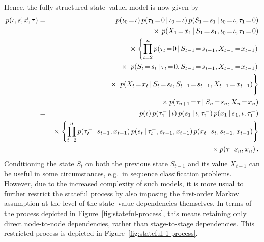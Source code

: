 \documentclass[a4paper]{article}
\begin{document}
Hence, the fully-structured state--valuel model is now given by
\begin{eqnarray}
p({\iota},\vec{s},\vec{x},{\tau}) & = & 
p(\iota_0\!=\!{\iota})\,p(\tau_1\!=\!0\,|\,\iota_0\!=\!{\iota})
\,p(S_1\!=\!s_1\,|\,\iota_0\!=\!{\iota},\tau_1\!=\!0)
\nonumber\\&&{}\times
\,p(X_1\!=\!x_1\,|\,S_1\!=\!s_1,\iota_0\!=\!{\iota},\tau_1\!=\!0)
\nonumber\\&&
{}\times\left\{\prod_{t=2}^{n}p(\tau_t\!=\!0\,|\,S_{t-1}\!=\!s_{t-1},X_{t-1}\!=\!x_{t-1})\right.
\nonumber\\&&\hspace*{10mm}{}\times\left.
\,p(S_t\!=\!s_t\,|\,\tau_t\!=\!0,S_{t-1}\!=\!s_{t-1},X_{t-1}\!=\!x_{t-1})\right.
\nonumber\\&&\hspace*{10mm}{}\times\left.\rule{0pt}{6mm}
\,p(X_t\!=\!x_t\,|\,S_t\!=\!s_t,S_{t-1}\!=\!s_{t-1},X_{t-1}\!=\!x_{t-1})\right\}
\nonumber\\&&
{}\times p(\tau_{n+1}\!=\!{\tau}\,|\,S_n\!=\!s_n,X_n\!=\!x_n)
\nonumber\\
&=&
p({\iota})\,p(\tau^-_1\,|\,{\iota})
\,p(s_1\,|\,{\iota},\tau^-_1)
\,p(x_1\,|\,s_1,{\iota},\tau^-_1)
\nonumber\\&&
{}\times\left\{\prod_{t=2}^{n}p(\tau^-_t\,|\,s_{t-1},x_{t-1})
\,p(s_t\,|\,\tau^-_t,s_{t-1},x_{t-1})
\,p(x_t\,|\,s_t,s_{t-1},x_{t-1})\right\}
\nonumber\\&&
{}\times p({\tau}\,|\,s_n,x_n)
\,.
\end{eqnarray}
Conditioning the state $S_t$ on both the previous state $S_{t-1}$ and its value $X_{t-1}$
can be useful in some circumstances, e.g.\ in sequence classification problems.
However, due to the increased complexity of such models, it is more usual to further restrict the stateful process
by also imposing the first-order Markov assumption at the level
of the state--value dependencies themselves. In terms of the process depicted in Figure~\ref{fig:stateful-process},
this means retaining only direct node-to-node dependencies, rather than stage-to-stage dependencies.
This restricted process is depicted in Figure~\ref{fig:stateful-1-process}.
\end{document}
